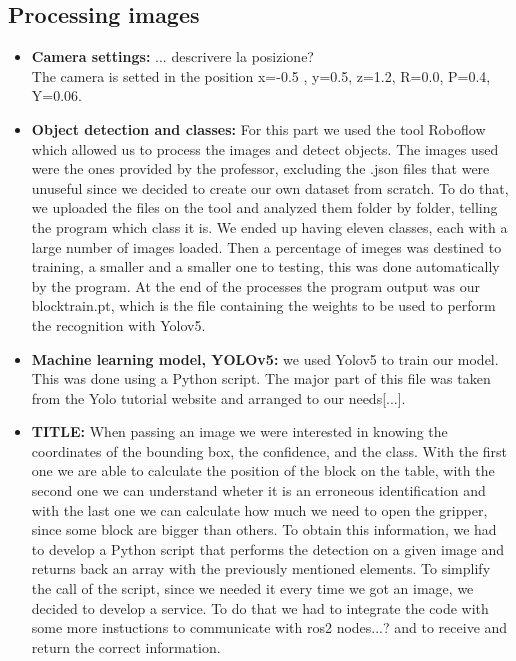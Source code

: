 \documentclass[12pt,a4paper]{article}
\begin{document}
\subsection{Processing images}\label{subsec:imageproc}
\begin{itemize}
    \item \textbf{Camera settings:} ... descrivere la posizione?\\
    The camera is setted in the position x=-0.5 , y=0.5, z=1.2, R=0.0, P=0.4, Y=0.06.
    \item \textbf{Object detection and classes:} For this part we used the tool Roboflow which allowed us to process the images and detect objects. The images used were the ones provided by the professor, excluding the .json files that were unuseful since we decided to create our own dataset from scratch. To do that, we uploaded the files on the tool and analyzed them folder by folder, telling the program which class it is. We ended up having eleven classes, each with a large number of images loaded. Then a percentage of imeges was destined to training, a smaller and a smaller one to testing, this was done automatically by the program. At the end of the processes the program output was our blocktrain.pt, which is the file containing the weights to be used to perform the recognition with Yolov5.
    \item \textbf{Machine learning model, YOLOv5:} we used Yolov5 to train our model. This was done using a Python script. The major part of this file was taken from the Yolo tutorial website and arranged to our needs[...]. 
    \item \textbf{TITLE:} When passing an image we were interested in knowing the coordinates of the bounding box, the confidence, and the class. With the first one we are able to calculate the position of the block on the table, with the second one we can understand wheter it is an erroneous identification and with the last one we can calculate how much we need to open the gripper, since some block are bigger than others. To obtain this information, we had to develop a Python script that performs the detection on a given image and returns back an array with the previously mentioned elements. To simplify the call of the script, since we needed it every time we got an image, we decided to develop a service. To do that we had to integrate the code with some more instuctions to communicate with ros2 nodes...? and to receive and return the correct information.
\end{itemize}
\end{document}
